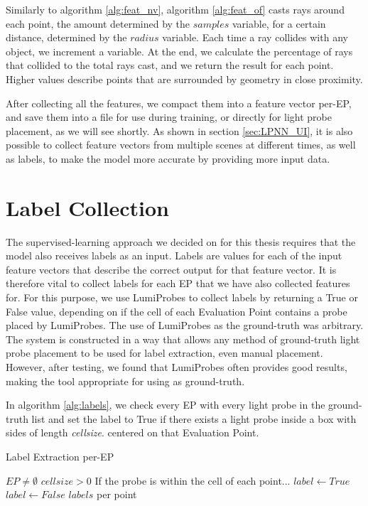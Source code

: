 Similarly to algorithm \ref{alg:feat_nv}, algorithm \ref{alg:feat_of} casts rays around each point, the amount determined by the $samples$ variable, for a certain distance, determined by the $radius$ variable. Each time a ray collides with any object, we increment a variable. At the end, we calculate the percentage of rays that collided to the total rays cast, and we return the result for each point. Higher values describe points that are surrounded by geometry in close proximity.

After collecting all the features, we compact them into a feature vector per-EP, and save them into a file for use during training, or directly for light probe placement, as we will see shortly. As shown in section \ref{sec:LPNN_UI}, it is also possible to collect feature vectors from multiple scenes at different times, as well as labels, to make the model more accurate by providing more input data. 

\section{Label Collection}
\label{sec:label_coll}

The supervised-learning approach we decided on for this thesis requires that the model also receives labels as an input. Labels are values for each of the input feature vectors that describe the correct output for that feature vector. It is therefore vital to collect labels for each EP that we have also collected features for. For this purpose, we use LumiProbes \parencite{Vardis2021} to collect labels by returning a True or False value, depending on if the cell of each Evaluation Point contains a probe placed by LumiProbes. The use of LumiProbes as the ground-truth was arbitrary. The system is constructed in a way that allows any method of ground-truth light probe placement to be used for label extraction, even manual placement. However, after testing, we found that LumiProbes often provides good results, making the tool appropriate for using as ground-truth. 

In algorithm \ref{alg:labels}, we check every EP with every light probe in the ground-truth list and set the label to True if there exists a light probe inside a box with sides of length \textit{cellsize}. centered on that Evaluation Point.

\begin{algorithm}
	\caption{Label Extraction per-EP}
	\label{alg:labels}
	\begin{algorithmic}[1]
		\Require $EP \neq \emptyset$
		\Require $cellsize > 0$
				\Comment If the probe is within the cell of each point...
					\State $label \gets True$
				\Else
					\State $label \gets False$
				\EndIf
			\EndFor
		\EndFor
		\State \Return $labels$ per point
	\end{algorithmic}
\end{algorithm}

